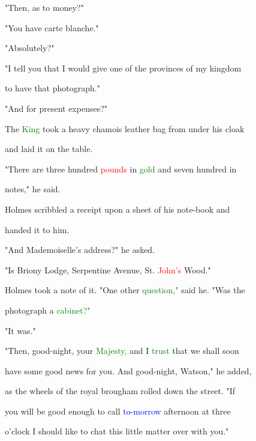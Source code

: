  "Then, as to \textcolor{BurntOrange}{money?"}



 "You have carte blanche."



 "Absolutely?"



 "I tell you that I would give one of the provinces of my kingdom

 to have that photograph."



 "And for \textcolor{BurntOrange}{present} expenses?"



 The \textcolor{green}{King} took a heavy chamois leather bag from under his cloak

 and laid it on the table.



 "There are three hundred \textcolor{red}{pounds} in \textcolor{green}{gold} and seven hundred in

 notes," he said.



 Holmes scribbled a receipt upon a sheet of his note-book and

 handed it to him.



 "And Mademoiselle's address?" he asked.



 "Is Briony Lodge, Serpentine Avenue, St. \textcolor{red}{John's} Wood."



 Holmes took a note of it. "One other \textcolor{green}{question,"} said he. "Was the

 photograph a \textcolor{green}{cabinet?"}



 "It was."



 "Then, good-night, your \textcolor{green}{Majesty,} and I \textcolor{green}{trust} that we shall soon

 have some \textcolor{BurntOrange}{good} news for you. And good-night, Watson," he added,

 as the wheels of the royal brougham rolled down the street. "If

 you will be \textcolor{BurntOrange}{good} enough to call \textcolor{blue}{to-morrow} afternoon at three

 o'clock I should like to chat this little matter over with you."





